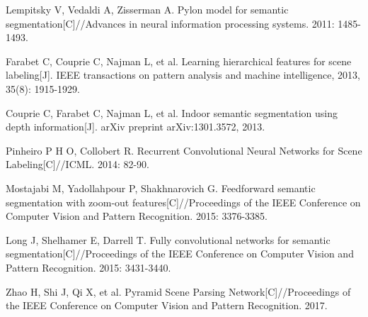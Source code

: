 \documentclass[10.5pt,compsoc]{TsT}
\theoremstyle{mystyle}
\begin{document}
{\begin{thebibliography}{99}
Lempitsky V, Vedaldi A, Zisserman A. Pylon model for semantic segmentation[C]//Advances in neural information processing systems. 2011: 1485-1493.

Farabet C, Couprie C, Najman L, et al. Learning hierarchical features for scene labeling[J]. IEEE transactions on pattern analysis and machine intelligence, 2013, 35(8): 1915-1929.

Couprie C, Farabet C, Najman L, et al. Indoor semantic segmentation using depth information[J]. arXiv preprint arXiv:1301.3572, 2013.

Pinheiro P H O, Collobert R. Recurrent Convolutional Neural Networks for Scene Labeling[C]//ICML. 2014: 82-90.




Mostajabi M, Yadollahpour P, Shakhnarovich G. Feedforward semantic segmentation with zoom-out features[C]//Proceedings of the IEEE Conference on Computer Vision and Pattern Recognition. 2015: 3376-3385.


Long J, Shelhamer E, Darrell T. Fully convolutional networks for semantic segmentation[C]//Proceedings of the IEEE Conference on Computer Vision and Pattern Recognition. 2015: 3431-3440.


Zhao H, Shi J, Qi X, et al. Pyramid Scene Parsing Network[C]//Proceedings of the IEEE Conference on Computer Vision and Pattern Recognition. 2017.


\end{thebibliography}}
\end{document}
